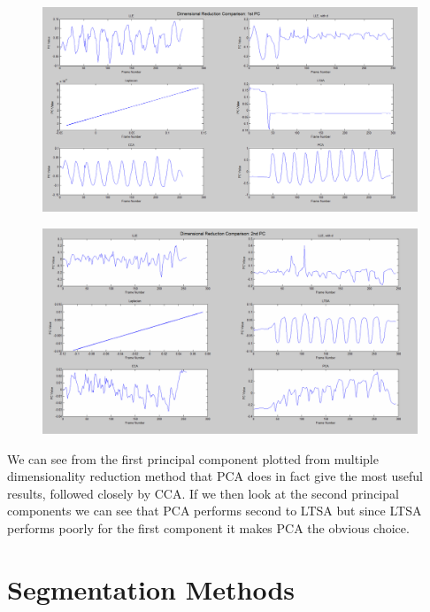 \begin{figure}[h]
    \centering
    \includegraphics[height=0.25\textheight]{fig03/drcomp.pdf}
    \label{fig:drcomp}
\end{figure}
\begin{figure}[h]
    \centering
    \includegraphics[height=0.25\textheight]{fig03/drcomp2.pdf}
    \label{fig:drcomp}
\end{figure}

We can see from the first principal component plotted from multiple dimensionality reduction method that PCA does in fact give the most useful results, followed closely by CCA. If we then look at the second principal components we can see that PCA performs second to LTSA but since LTSA performs poorly for the first component it makes PCA the obvious choice.


\section{Segmentation Methods}

